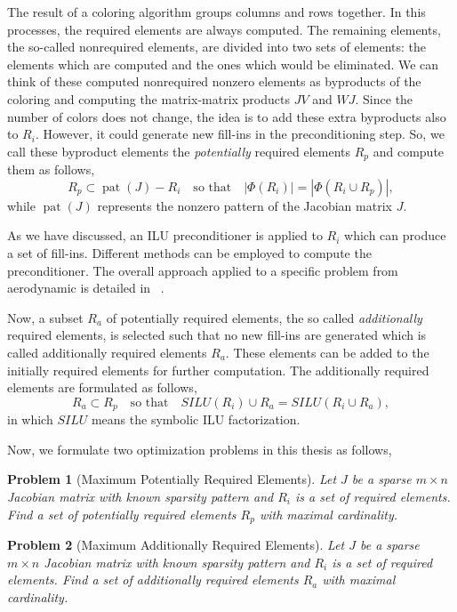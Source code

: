 \documentclass[12pt, twoside,a4paper,toc=bibliography]{scrbook}
\newtheorem{problem}{Problem}
\begin{document}
The result of a coloring algorithm groups columns and rows together.
In this processes, the required elements are always computed.
The remaining elements, the so-called nonrequired elements, 
are divided into two sets of
elements: the elements which are computed and the ones which would be
eliminated. We can think of these computed nonrequired nonzero elements as byproducts
of the coloring and computing the matrix-matrix products $JV$ and $WJ$.
Since the number of colors does not change,
the idea is to add these extra byproducts also to $R_i$.
However, it could generate new fill-ins in the preconditioning step.
So, we call these byproduct elements the \textit{potentially}
required elements $R_p$ and compute them as follows,
$$
R_p \subset \operatorname{pat}(J) - R_i \quad\text{so that}\quad |\Phi(R_i)| = |\Phi(R_i\cup R_p)|,
$$
while $\operatorname{pat}(J)$ represents the nonzero pattern of the Jacobian matrix $J$.

As we have discussed, an ILU preconditioner is applied to $R_i$ which can
produce a set of fill-ins.
Different methods can be employed to compute the preconditioner.
The overall approach applied to a specific problem from aerodynamic is detailed
in ~\cite{cscpaper}.

Now, a subset $R_a$ of potentially required elements, 
the so called \textit{additionally} required elements,
is selected such that no new fill-ins are generated which is called
additionally required elements $R_a$. These elements can be added to the
initially required elements for further computation.
The additionally required elements are formulated as follows,
$$
R_a \subset R_p \quad\text{so that}\quad SILU(R_i) \cup R_a = SILU(R_i\cup R_a),
$$
in which $SILU$ means the symbolic ILU factorization.

Now, we formulate two optimization problems in this thesis as follows,
\begin{problem}[Maximum Potentially Required Elements]
\label{p:max_pot}
%
Let $J$ be a sparse $m\times n$ Jacobian matrix with known sparsity pattern and
$R_i$ is a set of required elements.
Find a set of potentially required elements $R_p$ with maximal cardinality.
\end{problem}

\begin{problem}[Maximum Additionally Required Elements]
\label{p:max_add}
%
Let $J$ be a sparse $m\times n$ Jacobian matrix with known sparsity pattern and
$R_i$ is a set of required elements.
Find a set of additionally required elements $R_a$ with maximal cardinality.
\end{problem}
\end{document}
